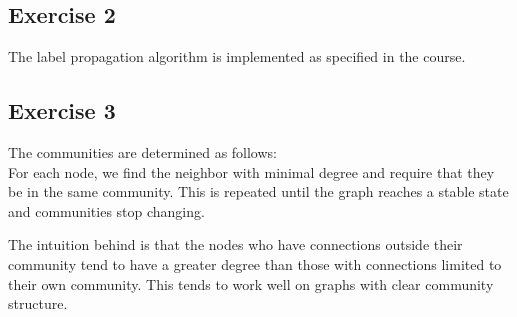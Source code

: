 \documentclass{article}
\begin{document}
\subsection*{Exercise 2}%
\label{sub:tp3ex2}
The label propagation algorithm is implemented as specified in the course.

\subsection*{Exercise 3}%
\label{sub:tp3ex3}
The communities are determined as follows:\\
For each node, we find the neighbor with minimal degree and require that they
be in the same community.
This is repeated until the graph reaches a stable state and communities stop
changing.

The intuition behind is that the nodes who have connections outside their
community tend to have a greater degree than those with connections limited
to their own community.
This tends to work well on graphs with clear community structure.
\end{document}
